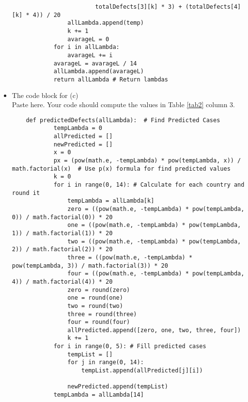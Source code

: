 \documentclass[a4 paper]{article}
\numberwithin{equation}{section}
\newcommand{\0}{\mathbf{0}}
\begin{document}
\begin{itemize}
\begin{lstlisting}
                        totalDefects[3][k] * 3) + (totalDefects[4][k] * 4)) / 20
                allLambda.append(temp)
                k += 1
                avarageL = 0
            for i in allLambda:
                avarageL += i
            avarageL = avarageL / 14
            allLambda.append(avarageL)
            return allLambda # Return lambdas
        \end{lstlisting}
		\item The code block for (c)\\
		Paste here. Your code should compute the values in Table \ref{tab2} column 3. 
		\begin{lstlisting}
    def predictedDefects(allLambda):  # Find Predicted Cases
            tempLambda = 0
            allPredicted = []
            newPredicted = []
            x = 0
            px = (pow(math.e, -tempLambda) * pow(tempLambda, x)) / math.factorial(x)  # Use p(x) formula for find predicted values
            k = 0
            for i in range(0, 14): # Calculate for each country and round it
                tempLambda = allLambda[k]
                zero = ((pow(math.e, -tempLambda) * pow(tempLambda, 0)) / math.factorial(0)) * 20
                one = ((pow(math.e, -tempLambda) * pow(tempLambda, 1)) / math.factorial(1)) * 20
                two = ((pow(math.e, -tempLambda) * pow(tempLambda, 2)) / math.factorial(2)) * 20
                three = ((pow(math.e, -tempLambda) * pow(tempLambda, 3)) / math.factorial(3)) * 20
                four = ((pow(math.e, -tempLambda) * pow(tempLambda, 4)) / math.factorial(4)) * 20
                zero = round(zero)
                one = round(one)
                two = round(two)
                three = round(three)
                four = round(four)
                allPredicted.append([zero, one, two, three, four])
                k += 1
            for i in range(0, 5): # Fill predicted cases
                tempList = []
                for j in range(0, 14):
                    tempList.append(allPredicted[j][i])
        
                newPredicted.append(tempList)
            tempLambda = allLambda[14]


\end{lstlisting}
\end{itemize}
\end{document}
